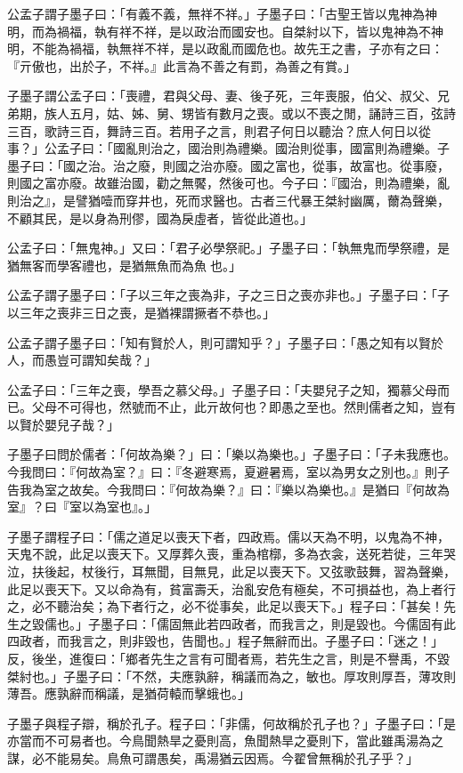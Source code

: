 \begin{pinyinscope}
公孟子謂子墨子曰：「有義不義，無祥不祥。」子墨子曰：「古聖王皆以鬼神為神明，而為禍福，執有祥不祥，是以政治而國安也。自桀紂以下，皆以鬼神為不神明，不能為禍福，執無祥不祥，是以政亂而國危也。故先王之書，子亦有之曰：『亓傲也，出於子，不祥。』此言為不善之有罰，為善之有賞。」

子墨子謂公孟子曰：「喪禮，君與父母、妻、後子死，三年喪服，伯父、叔父、兄弟期，族人五月，姑、姊、舅、甥皆有數月之喪。或以不喪之閒，誦詩三百，弦詩三百，歌詩三百，舞詩三百。若用子之言，則君子何日以聽治？庶人何日以從事？」公孟子曰：「國亂則治之，國治則為禮樂。國治則從事，國富則為禮樂。子墨子曰：「國之治。治之廢，則國之治亦廢。國之富也，從事，故富也。從事廢，則國之富亦廢。故雖治國，勸之無饜，然後可也。今子曰：『國治，則為禮樂，亂則治之』，是譬猶噎而穿井也，死而求醫也。古者三代暴王桀紂幽厲，薾為聲樂，不顧其民，是以身為刑僇，國為戾虛者，皆從此道也。」

公孟子曰：「無鬼神。」又曰：「君子必學祭祀。」子墨子曰：「執無鬼而學祭禮，是猶無客而學客禮也，是猶無魚而為魚𦊟也。」

公孟子謂子墨子曰：「子以三年之喪為非，子之三日之喪亦非也。」子墨子曰：「子以三年之喪非三日之喪，是猶裸謂撅者不恭也。」

公孟子謂子墨子曰：「知有賢於人，則可謂知乎？」子墨子曰：「愚之知有以賢於人，而愚豈可謂知矣哉？」

公孟子曰：「三年之喪，學吾之慕父母。」子墨子曰：「夫嬰兒子之知，獨慕父母而已。父母不可得也，然號而不止，此亓故何也？即愚之至也。然則儒者之知，豈有以賢於嬰兒子哉？」

子墨子曰問於儒者：「何故為樂？」曰：「樂以為樂也。」子墨子曰：「子未我應也。今我問曰：『何故為室？』曰：『冬避寒焉，夏避暑焉，室以為男女之別也。』則子告我為室之故矣。今我問曰：『何故為樂？』曰：『樂以為樂也。』是猶曰『何故為室』？曰『室以為室也』。」

子墨子謂程子曰：「儒之道足以喪天下者，四政焉。儒以天為不明，以鬼為不神，天鬼不說，此足以喪天下。又厚葬久喪，重為棺槨，多為衣衾，送死若徙，三年哭泣，扶後起，杖後行，耳無聞，目無見，此足以喪天下。又弦歌鼓舞，習為聲樂，此足以喪天下。又以命為有，貧富壽夭，治亂安危有極矣，不可損益也，為上者行之，必不聽治矣；為下者行之，必不從事矣，此足以喪天下。」程子曰：「甚矣！先生之毀儒也。」子墨子曰：「儒固無此若四政者，而我言之，則是毀也。今儒固有此四政者，而我言之，則非毀也，告聞也。」程子無辭而出。子墨子曰：「迷之！」反，後坐，進復曰：「鄉者先生之言有可聞者焉，若先生之言，則是不譽禹，不毀桀紂也。」子墨子曰：「不然，夫應孰辭，稱議而為之，敏也。厚攻則厚吾，薄攻則薄吾。應孰辭而稱議，是猶荷轅而擊蛾也。」

子墨子與程子辯，稱於孔子。程子曰：「非儒，何故稱於孔子也？」子墨子曰：「是亦當而不可易者也。今鳥聞熱旱之憂則高，魚聞熱旱之憂則下，當此雖禹湯為之謀，必不能易矣。鳥魚可謂愚矣，禹湯猶云因焉。今翟曾無稱於孔子乎？」


\end{pinyinscope}
